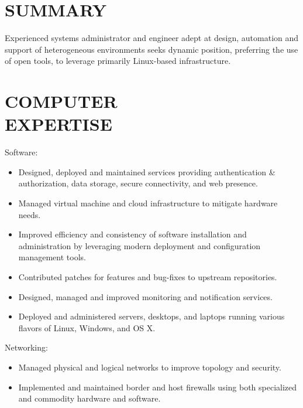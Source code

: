 \documentclass[line,margin]{res}
\begin{document}

\address{1406 Spruce Pl. Apt 5, Minneapolis, MN 55403}
\address{deisum@gmail.com 612.205.9789}
 
\begin{resume}
 
\section{SUMMARY}
    Experienced systems administrator and engineer adept at design,
    automation and support of heterogeneous environments seeks dynamic
    position, preferring the use of open tools, to leverage primarily
    Linux-based infrastructure. 
 

\section{COMPUTER \\ EXPERTISE}
    Software:
    \vspace{1 mm}
    \begin{itemize} \itemsep -1.5pt %
        \item Designed, deployed and maintained services providing
        authentication \& authorization, data storage, secure
        connectivity, and web presence.
        \item Managed virtual machine and cloud infrastructure to mitigate
        hardware needs.
        \item Improved efficiency and consistency of software installation
        and administration by leveraging modern deployment and
        configuration management tools.
        \item Contributed patches for features and bug-fixes to upstream
        repositories.
        \item Designed, managed and improved monitoring and notification
        services.
        \item Deployed and administered servers, desktops, and laptops
        running various flavors of Linux, Windows, and OS X.
    \end{itemize}
    \vspace{-3 mm}

    Networking:
    \vspace{1 mm}
    \begin{itemize} \itemsep -1.5pt %
        \item Managed physical and logical networks to improve topology
        and security.
        \item Implemented and maintained border and host firewalls using
        both specialized and commodity hardware and software.
    \end{itemize}
    \vspace{-3 mm}


\end{resume}
\end{document}
